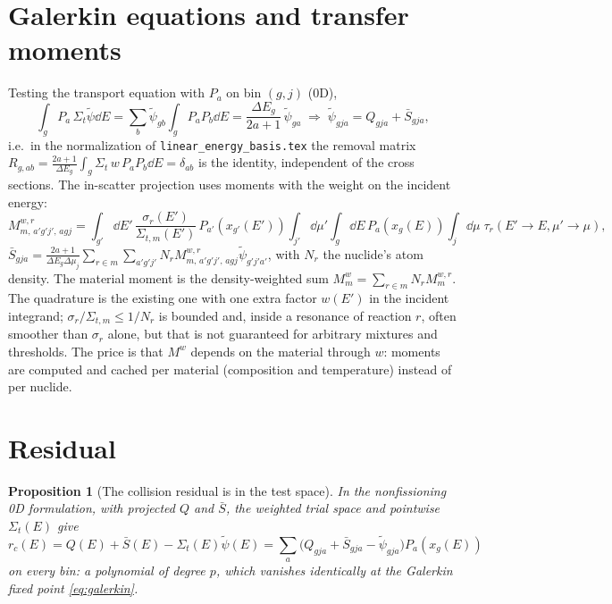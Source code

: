 \documentclass[11pt]{article}
\newtheorem{proposition}{Proposition}
\newcommand{\tpsi}{\tilde\psi}
\newcommand{\Sbar}{\bar S}
\newcommand{\Sigt}{\Sigma_t}
\begin{document}
\section{Galerkin equations and transfer moments}

Testing the transport equation with $P_a$ on bin $(g,j)$ (0D),
\begin{equation}
  \int_g P_a\,\Sigt\tpsi\dd E = \sum_b\tpsi_{gb}\int_g P_aP_b\dd E
  = \frac{\Delta E_g}{2a+1}\,\tpsi_{ga}
  \;\Longrightarrow\;
  \tpsi_{gja} = Q_{gja} + \Sbar_{gja},
  \label{eq:galerkin}
\end{equation}
i.e.\ in the normalization of \texttt{linear\_energy\_basis.tex} the removal matrix
$R_{g,ab} = \frac{2a+1}{\Delta E_g}\int_g \Sigt\,w\,P_aP_b\dd E = \delta_{ab}$ is the
identity, independent of the cross sections. The in-scatter projection uses moments
with the weight on the incident energy:
\begin{equation}
  M^{w,r}_{m,\,a'g'j',\,agj} = \int_{g'}\!\dd E'\,
  \frac{\sigma_r(E')}{\Sigma_{t,m}(E')}\,P_{a'}(x_{g'}(E'))
  \int_{j'}\!\dd\mu'\int_g\!\dd E\,P_a(x_g(E))\int_j\!\dd\mu\;
  \tau_r(E'\!\to E,\mu'\!\to\mu),
\end{equation}
$\Sbar_{gja} = \frac{2a+1}{\Delta E_g\Delta\mu_j}
\sum_{r\in m}\sum_{a'g'j'}N_rM^{w,r}_{m,\,a'g'j',\,agj}\tpsi_{g'j'a'}$,
with $N_r$ the nuclide's atom density. The material moment is the density-weighted
sum $M^w_m=\sum_{r\in m}N_rM^{w,r}_m$. The quadrature is
the existing one with one extra factor $w(E')$ in the incident integrand;
$\sigma_r/\Sigma_{t,m}\le 1/N_r$ is bounded and, inside a resonance of reaction $r$,
often smoother than $\sigma_r$ alone, but that is not guaranteed for arbitrary
mixtures and thresholds. The price is that $M^w$ depends on the material through
$w$: moments are computed and cached per material (composition and temperature) instead
of per nuclide.

\section{Residual}

\begin{proposition}[The collision residual is in the test space]
In the nonfissioning 0D formulation, with projected $Q$ and $\Sbar$, the weighted
trial space and pointwise $\Sigt(E)$ give
\[
  r_c(E) = Q(E) + \Sbar(E) - \Sigt(E)\tpsi(E)
  = \sum_a\big(Q_{gja} + \Sbar_{gja} - \tpsi_{gja}\big)P_a(x_g(E))
\]
on every bin: a polynomial of degree $p$, which vanishes identically at the Galerkin
fixed point \eqref{eq:galerkin}.
\end{proposition}
\end{document}
